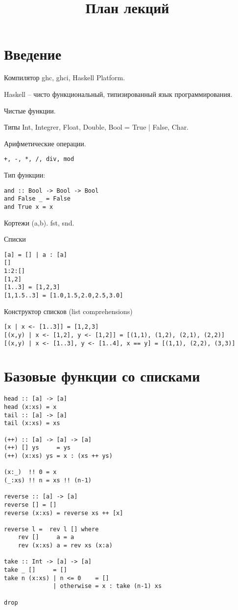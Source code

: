 \documentclass[a4paper,10pt]{article}
\begin{document}
\lstset{language=Haskell} 
\setcounter{secnumdepth}{0}
\title{План лекций}
\date{}
\maketitle

\section{Введение}
Компилятор ghc, ghci, Haskell Platform.

Haskell – чисто функциональный, типизированный язык программирования.

Чистые функции.

Типы Int, Integrer, Float, Double, Bool = True | False, Char.

Арифметические операции.
\begin{lstlisting}
+, -, *, /, div, mod
\end{lstlisting}

Тип функции:
\begin{lstlisting}
and :: Bool -> Bool -> Bool
and False _ = False
and True x = x
\end{lstlisting}

Кортежи (a,b).
fst, snd.

Списки
\begin{lstlisting}
[a] = [] | a : [a]
[]
1:2:[]
[1,2]
[1..3] = [1,2,3]
[1,1.5..3] = [1.0,1.5,2.0,2.5,3.0]
\end{lstlisting}

Конструктор списков (list comprehensions)
\begin{lstlisting}
[x | x <- [1..3]] = [1,2,3]
[(x,y) | x <- [1,2], y <- [1,2]] = [(1,1), (1,2), (2,1), (2,2)]
[(x,y) | x <- [1..3], y <- [1..4], x == y] = [(1,1), (2,2), (3,3)]
\end{lstlisting}

\section{Базовые функции со списками}
\begin{lstlisting}
head :: [a] -> [a]
head (x:xs) = x
tail :: [a] -> [a]
tail (x:xs) = xs

(++) :: [a] -> [a] -> [a]
(++) [] ys     = ys
(++) (x:xs) ys = x : (xs ++ ys)

(x:_)  !! 0 = x
(_:xs) !! n = xs !! (n-1)

reverse :: [a] -> [a]
reverse [] = []
reverse (x:xs) = reverse xs ++ [x]

reverse l =  rev l [] where
    rev []     a = a
    rev (x:xs) a = rev xs (x:a)

take :: Int -> [a] -> [a]
take _ []     = []
take n (x:xs) | n <= 0    = []
              | otherwise = x : take (n-1) xs

drop

\end{lstlisting}
\end{document}

